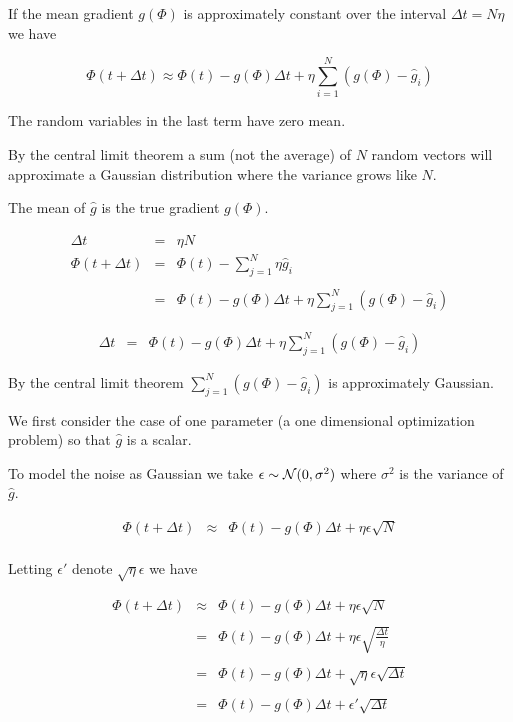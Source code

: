 {If the mean gradient $g(\Phi)$ is approximately constant over the interval $\Delta t = N \eta$ we have

$$\Phi(t + \Delta t)  \approx \Phi(t) -g(\Phi)\Delta t + \eta \sum_{i=1}^N (g(\Phi) - \hat{g}_i)$$

\vfill
The random variables in the last term have zero mean.

\vfill
By the central limit theorem a sum (not the average) of $N$ random vectors will approximate a Gaussian distribution where the variance
grows like $N$.


The mean of $\hat{g}$ is the true gradient $g(\Phi)$.  

\begin{eqnarray*}
\Delta t & = & \eta N \\
\Phi(t + \Delta t) &  = & \Phi(t) - \sum_{j=1}^N \eta\hat{g}_i \\
\\
 &  = & \Phi(t) -g(\Phi)\Delta t + \eta \sum_{j=1}^N (g(\Phi) - \hat{g}_i)
\end{eqnarray*}


\begin{eqnarray*}
\Delta t & = &  \Phi(t) -g(\Phi)\Delta t + \eta \sum_{j=1}^N (g(\Phi) - \hat{g}_i)
\end{eqnarray*}


\vfill
By the central limit theorem $\sum_{j=1}^N (g(\Phi) - \hat{g}_i)$ is approximately Gaussian.


We first consider the case of one parameter (a one dimensional optimization problem) so that $\hat{g}$ is a scalar.

\vfill
To model the noise as Gaussian we take $\epsilon \sim {\cal N}(0,\sigma^2)$ where $\sigma^2$ is the variance of $\hat{g}$.

\begin{eqnarray*}
\Phi(t + \Delta t) & \approx & \Phi(t) -g(\Phi)\Delta t + \eta \epsilon \sqrt{N} \\
\end{eqnarray*}



Letting $\epsilon'$ denote $\sqrt{\eta}\epsilon$ we have

\vfill
\begin{eqnarray*}
\Phi(t + \Delta t) & \approx & \Phi(t) -g(\Phi)\Delta t +  \eta \epsilon \sqrt{N} \\
\\
& = & \Phi(t) -g(\Phi)\Delta t +  \eta \epsilon \sqrt{\frac{\Delta t}{\eta}} \\
\\
& = & \Phi(t) -g(\Phi)\Delta t +  \sqrt{\eta} \epsilon \sqrt{\Delta t} \\
\\
& = & \Phi(t) -g(\Phi)\Delta t +  \epsilon' \sqrt{\Delta t} \\
\end{eqnarray*}

}

